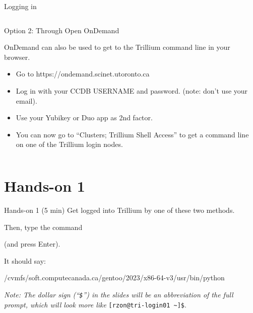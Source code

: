 \documentclass[
  10pt,
  ignorenonframetext,
  aspectratio=169,handout]{beamer}
\newenvironment{Shaded}{\begin{snugshade}}{\end{snugshade}}
\newcommand{\DecValTok}[1]{\textcolor[rgb]{0.86,0.86,0.80}{#1}}
\newcommand{\ExtensionTok}[1]{\textcolor[rgb]{0.80,0.80,0.80}{#1}}
\newcommand{\NormalTok}[1]{\textcolor[rgb]{0.80,0.80,0.80}{#1}}
\begin{document}
\begin{frame}[fragile]{Logging in}
\begin{columns}[T]
\begin{column}{0.47\linewidth}
\begin{block}{Option 2: Through Open OnDemand}
\pause

OnDemand can also be used to get to the Trillium command line in \alert{your browser.}

\begin{itemize}
\item
  Go to \alert{https://ondemand.scinet.utoronto.ca}

  \pause
\item
  Log in with your CCDB USERNAME and password. (note: don't use your email).

  \pause
\item
  Use your Yubikey or Duo app as 2nd factor.

  \pause
\item
  You can now go to ``Clusters; Trillium Shell Access'' to get a command line on one of the Trillium login nodes.
\end{itemize}
\end{block}
\end{column}
\end{columns}
\end{frame}

\section{Hands-on 1}\label{hands-on-1}

\begin{frame}[fragile]{Hands-on 1 (5 min)}
\label{hands-on-1-5-min}
Get logged into Trillium by one of these two methods.

Then, type the command

\begin{Shaded}
\end{Shaded}

(and press Enter).

It should say:

\begin{Shaded}
\begin{Highlighting}[]
\NormalTok{/cvmfs/soft.computecanada.ca/gentoo/}\DecValTok{2023}\NormalTok{/x86}\DecValTok{{-}64}\NormalTok{{-}v3/usr/bin/python}
\end{Highlighting}
\end{Shaded}

\vspace{\baselineskip}

\pause

\emph{Note: The dollar sign (``\texttt{\$}'') in the slides will be an abbreviation of the full prompt, which will look more like} \texttt{{[}rzon@tri-login01\ \textasciitilde{}{]}\$}.
\end{frame}
\end{document}
